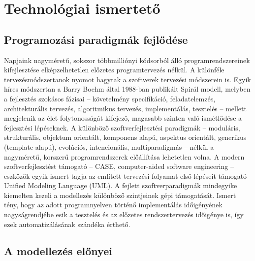 \chapter{Technológiai ismertető}

\section{Programozási paradigmák fejlődése}

Napjaink nagyméretű, sokszor többmilliónyi kódsorból álló programrendszereinek kifejlesztése elképzelhetetlen előzetes programtervezés nélkül.
A különféle tervezésmódszertanok nyomot hagytak a szoftverek tervezési módszerein is.
Egyik híres módszertan a Barry Boehm által 1988-ban publikált Spirál modell, melyben a fejlesztés szokásos fázisai -- követelmény specifikáció, feladatelemzés, architekturális tervezés, algoritmikus tervezés, implementálás, tesztelés -- mellett megjelenik az élet folytonosságát kifejező, magasabb szinten való ismétlődése a fejlesztési lépéseknek.
A különböző szoftverfejlesztési paradigmák -- moduláris, strukturális, objektum orientált, komponens alapú, aspektus orientált, generikus (template alapú), evolúciós, intencionális, multiparadigmás -- nélkül a nagyméretű, korszerű programrendszerek előállítása lehetetlen volna.
A modern szoftverfejlesztést támogató -- \gls{CASE}, computer-aided software engineering -- eszközök egyik ismert tagja az említett tervezési folyamat első lépéseit támogató Unified Modeling Language (\gls{UML}).  
A fejlett szoftverparadigmák mindegyike kiemelten kezeli a modellezés különböző szintjeinek gépi támogatását.
Ismert tény, hogy az adott programnyelven történő implementálás időigényének nagyságrendjébe esik a tesztelés és az előzetes rendszertervezés időigénye is, így ezek automatizálásának szándéka érthető.


\section{A modellezés előnyei}

